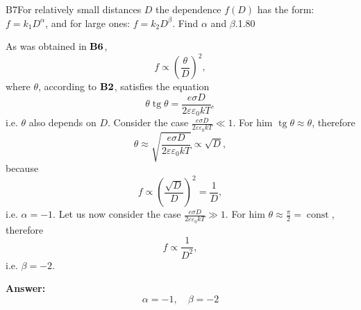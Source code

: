 \documentclass[11pt,a4paper]{article}
\begin{document}
\begin{solcard}{B7}{For relatively small distances $D$ the dependence $f(D)$ has the form: $f=k_1D^\alpha$, and for large ones: $f=k_2D^\beta$. Find $\alpha$ and $\beta$.}{1.80}

As was obtained in $\bf B6$,\[f\propto\left(\frac\theta D\right)^2,\]where $\theta$, according to $\bf B2$, satisfies the equation \[\theta\operatorname{tg}\theta=\frac{e\sigma D}{2\varepsilon\varepsilon_0kT},\]i.e. $\theta$ also depends on $D$. Consider the case $\frac{e\sigma D}{2\varepsilon\varepsilon_0kT}\ll1$. For him $\operatorname{tg}\theta\approx\theta$, therefore\[\theta\approx\sqrt{\frac{e\sigma D}{2\varepsilon\varepsilon_0kT}}\propto\sqrt D,\]because\[f\propto\left(\frac{\sqrt D}D\right)^2=\frac1D,\]i.e. $\alpha=-1$. Let us now consider the case $\frac{e\sigma D}{2\varepsilon\varepsilon_0kT}\gg1$. For him $\theta\approx\frac\pi2=\operatorname{const}$, therefore \[f\propto\frac1{D^2},\]i.e. $\beta=-2$.

\par\smallskip\noindent\textbf{Answer:} \[\alpha=-1,\quad\beta=-2\]
\end{solcard}
\end{document}
